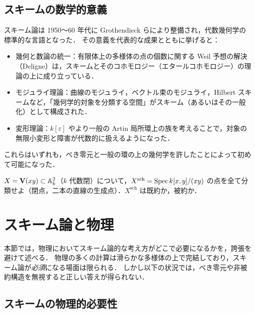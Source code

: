 \subsection{スキームの数学的意義}

スキーム論は 1950〜60 年代に Grothendieck らにより整備され，代数幾何学の標準的な言語となった．
その意義を代表的な成果とともに挙げると：
\begin{itemize}
  \item 幾何と数論の統一：有限体上の多様体の点の個数に関する Weil 予想の解決（Deligne）は，スキームとそのコホモロジー（エタールコホモロジー）の理論の上に成り立っている．
  \item モジュライ理論：曲線のモジュライ，ベクトル束のモジュライ，Hilbert スキームなど，「幾何学的対象を分類する空間」がスキーム（あるいはその一般化）として構成された．
  \item 変形理論：$k[\varepsilon]$ やより一般の Artin 局所環上の族を考えることで，対象の無限小変形と障害が代数的に扱えるようになった．
\end{itemize}
これらはいずれも，べき零元と一般の環の上の幾何学を許したことによって初めて可能になった．

$X=\mathbf{V}(xy)\subset\mathbb{A}^2_k$（$k$ 代数閉）について，$X^{\mathrm{sch}}=\operatorname{Spec} k[x,y]/(xy)$ の点を全て分類せよ（閉点，二本の直線の生成点）．$X^{\mathrm{sch}}$ は既約か，被約か．

\section{スキーム論と物理}

本節では，物理においてスキーム論的な考え方がどこで必要になるかを，誇張を避けて述べる．
物理の多くの計算は滑らかな多様体の上で完結しており，スキーム論が\emph{必須}になる場面は限られる．
しかし以下の状況では，べき零元や非被約構造を無視すると正しい答えが得られない．

\subsection{スキームの物理的必要性}

